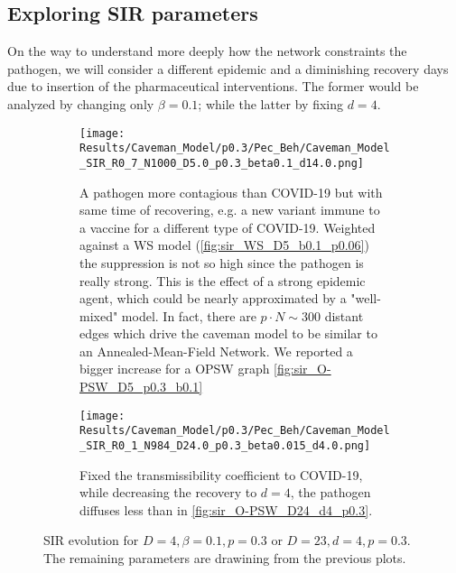 \documentclass[a4paper,10pt,twoside]{book} %
\theoremstyle{definition}
\begin{document}
\clearpage
\subsection*{Exploring SIR parameters}
On the way to understand more deeply how the network constraints the pathogen, we will consider a different epidemic and a diminishing recovery days due to insertion of the pharmaceutical interventions. The former would be analyzed by changing only $\beta = 0.1$; while the latter by fixing $d = 4$.
\begin{figure}[H]
	\centering
	\begin{subfigure}{0.9\linewidth}
		\texttt{[image: Results/Caveman\_Model/p0.3/Pec\_Beh/Caveman\_Model\_SIR\_R0\_7\_N1000\_D5.0\_p0.3\_beta0.1\_d14.0.png]}
		\caption{A pathogen more contagious than COVID-19 but with same time of recovering, e.g. a new variant immune to a vaccine for a different type of COVID-19. Weighted against a WS model (\autoref{fig:sir_WS_D5_b0.1_p0.06}) the suppression is not so high since the pathogen is really strong. This is the effect of a strong epidemic agent, which could be nearly approximated by a "well-mixed" model. In fact, there are $p \cdot N \sim 300$ distant edges which drive the caveman model to be similar to an Annealed-Mean-Field Network. We reported a bigger increase for a OPSW graph \autoref{fig:sir_O-PSW_D5_p0.3_b0.1}}
		\label{fig:sir_CM_D4_p0.3_OR1_b0.1}
	\end{subfigure}
	\par\bigskip
	\centering
	\begin{subfigure}{0.9\linewidth}
		\texttt{[image: Results/Caveman\_Model/p0.3/Pec\_Beh/Caveman\_Model\_SIR\_R0\_1\_N984\_D24.0\_p0.3\_beta0.015\_d4.0.png]}
		\caption{Fixed the transmissibility coefficient to COVID-19, while decreasing the recovery to $d = 4$, the pathogen diffuses less than in \autoref{fig:sir_O-PSW_D24_d4_p0.3}.}
		\label{fig:sir_CM_D23_d4_p0.3}
	\end{subfigure}
	\caption{SIR evolution for $D = 4, \beta = 0.1, p = 0.3$ or $ D=23,d=4, p = 0.3$. The remaining parameters are drawining from the previous plots.}
	\label{fig:sir_CMD4b0.1_D23d4_p0.3}
\end{figure}

\clearpage
\end{document}
